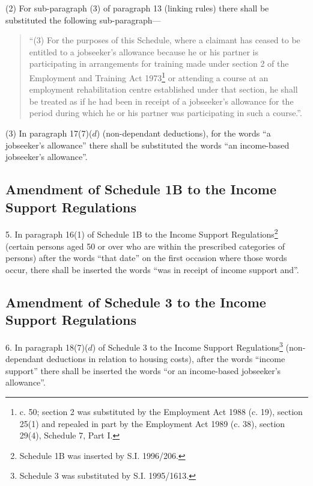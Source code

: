 \documentclass[12pt,a4paper]{article}
\begin{document}
(2) For sub-paragraph (3) of paragraph 13 (linking rules) there shall be substituted the following sub-paragraph—
\begin{quotation}
“(3) For the purposes of this Schedule, where a claimant has ceased to be entitled to a jobseeker’s allowance because he or his partner is participating in arrangements for training made under section 2 of the Employment and Training Act 1973\footnote{ c. 50; section 2 was substituted by the Employment Act 1988 (c. 19), section 25(1) and repealed in part by the Employment Act 1989 (c. 38), section 29(4), Schedule 7, Part I.} or attending a course at an employment rehabilitation centre established under that section, he shall be treated as if he had been in receipt of a jobseeker’s allowance for the period during which he or his partner was participating in such a course.”.
\end{quotation}

(3) In paragraph 17(7)($d$) (non-dependant deductions), for the words “a jobseeker’s allowance” there shall be substituted the words “an income-based jobseeker’s allowance”.

\subsection[5. Amendment of Schedule 1B to the Income Support Regulations]{Amendment of Schedule 1B to the Income Support Regulations}

5.  In paragraph 16(1) of Schedule 1B to the Income Support Regulations\footnote{\frenchspacing Schedule 1B was inserted by S.I. 1996/206.} (certain persons aged 50 or over who are within the prescribed categories of persons) after the words “that date” on the first occasion where those words occur, there shall be inserted the words “was in receipt of income support and”.

\subsection[6. Amendment of Schedule 3 to the Income Support Regulations]{Amendment of Schedule 3 to the Income Support Regulations}

6.  In paragraph 18(7)($d$) of Schedule 3 to the Income Support Regulations\footnote{\frenchspacing Schedule 3 was substituted by S.I. 1995/1613.} (non-dependant deductions in relation to housing costs), after the words “income support” there shall be inserted the words “or an income-based jobseeker’s allowance”.
\end{document}
